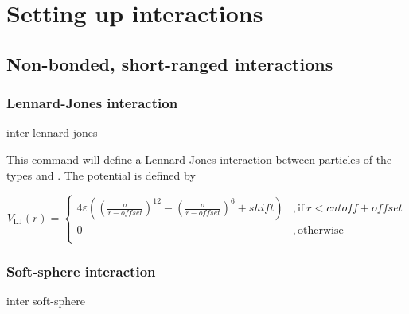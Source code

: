 \chapter{Setting up interactions}
\label{sec:inter}

\section{Non-bonded, short-ranged interactions}
\label{sec:inter-nb}

\subsection{Lennard-Jones interaction}

\begin{essyntax}
  inter 
  lennard-jones
  \var{$\epsilon$} \var{$\sigma$}
    
  \begin{features}
  \end{features}
\end{essyntax}
This command will define a Lennard-Jones interaction between particles
of the types  and .  The potential is defined by

\begin{equation}
  V_\mathrm{LJ}(r) = \left\{
    \begin{array}{ll}
      4\varepsilon((\frac{\sigma}{r-\mathit{offset}})^{12}
      -(\frac{\sigma}{r-\mathit{offset}})^6+\mathit{shift})
      & \mathrm{, if~} r < \mathit{cutoff}+\mathit{offset}\\
      \mathit{0}
      & \mathrm{, otherwise}\\
    \end{array}
  \right.
\end{equation}

\subsection{Soft-sphere interaction}
\begin{essyntax}
  inter  
  soft-sphere    
\end{essyntax}

